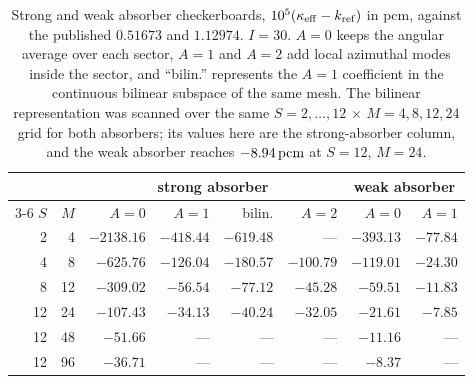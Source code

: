 \begin{table}[htbp]
\centering
\caption{Strong and weak absorber checkerboards, $10^{5}(\kappa_{\mathrm{eff}}-k_\mathrm{ref})$ in pcm, against the published $0.51673$ and $1.12974$. $I{=}30$. $A{=}0$ keeps the angular average over each sector, $A{=}1$ and $A{=}2$ add local azimuthal modes inside the sector, and ``bilin.'' represents the $A{=}1$ coefficient in the continuous bilinear subspace of the same mesh. The bilinear representation was scanned over the same $S{=}2,\ldots,12$ $\times$ $M{=}4,8,12,24$ grid for both absorbers; its values here are the strong-absorber column, and the weak absorber reaches $-8.94\,\mathrm{pcm}$ at $S{=}12$, $M{=}24$.}
\label{tab:study4-checker}
\centering\small
\begin{tabular}{rrrrrrrr}
\hline
& & \multicolumn{4}{c}{strong absorber} & \multicolumn{2}{c}{weak absorber}\\
\cline{3-6}\cline{7-8}
$S$ & $M$ & $A{=}0$ & $A{=}1$ & bilin. & $A{=}2$ & $A{=}0$ & $A{=}1$\phantom{, bil.}\\
\hline
2 & 4 & $-2138.16$ & $-418.44$ & $-619.48$ & --- & $-393.13$ & $-77.84$\\
4 & 8 & $-625.76$ & $-126.04$ & $-180.57$ & $-100.79$ & $-119.01$ & $-24.30$\\
8 & 12 & $-309.02$ & $-56.54$ & $-77.12$ & $-45.28$ & $-59.51$ & $-11.83$\\
12 & 24 & $-107.43$ & $-34.13$ & $-40.24$ & $-32.05$ & $-21.61$ & $-7.85$\\
12 & 48 & $-51.66$ & --- & --- & --- & $-11.16$ & ---\\
12 & 96 & $-36.71$ & --- & --- & --- & $-8.37$ & ---\\
\hline
\end{tabular}
\end{table}
